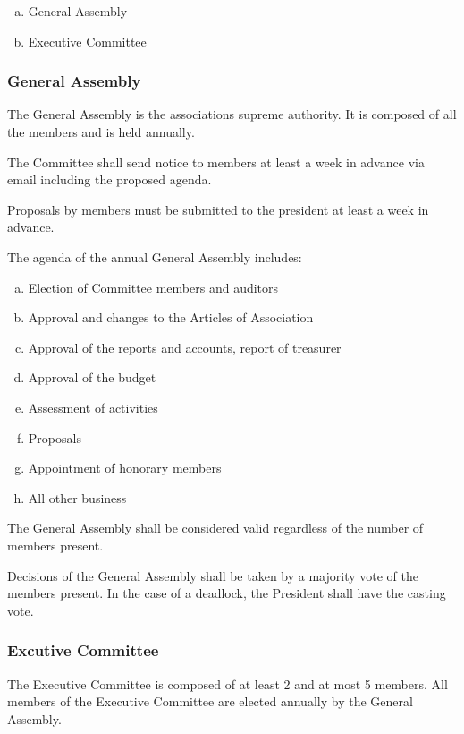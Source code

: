 \documentclass[12pt,a4paper,oneside]{article}
\newcounter{art}
\newcommand{\english}{    \switchcolumn[0]\noindent}
\begin{document}
\begin{paracol}{2}
	\begin{enumerate}[(a)]
	\item General Assembly
	\item Executive Committee
	\end{enumerate}


	\english
	\subsubsection{General Assembly}
	The General Assembly is the associations supreme authority. It is composed of all the members and is held annually.

	The Committee shall send notice to members at least a week in advance via email including the proposed agenda.

	Proposals by members must be submitted to the president at least a week in advance.

	The agenda of the annual General Assembly includes:
	\begin{enumerate}[(a)]
	\item Election of Committee members and auditors
	\item Approval and changes to the Articles of Association
	\item Approval of the reports and accounts, report of treasurer
	\item Approval of the budget
	\item Assessment of activities
	\item Proposals
	\item Appointment of honorary members
	\item All other business
	\end{enumerate}

	The General Assembly shall be considered valid regardless of the number of members present.

	Decisions of the General Assembly shall be taken by a majority vote of the members present. In the case of a deadlock, the President shall have the casting vote.


	\english
	\subsubsection{Excutive Committee}

	The Executive Committee is composed of at least 2 and at most 5 members. 
	All members of the Executive Committee are elected annually by the General Assembly.


\end{paracol}
\end{document}
